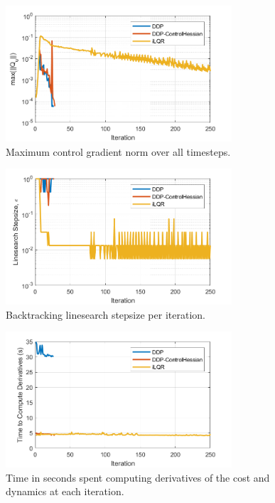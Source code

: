 \begin{figure}[h!]
	\centering
	\includegraphics[width=0.75\textwidth]{Images/Convergence/grad_norm}
	\caption{Maximum control gradient norm over all timesteps.}
	\label{Fig:ConvergeGradient}
\end{figure}
\begin{figure}[h!]
	\centering
	\includegraphics[width=0.75\textwidth]{Images/Convergence/alpha}
	\caption{Backtracking linesearch stepsize per iteration.}
	\label{Fig:ConvergeStepsize}
\end{figure}
\begin{figure}[h!]
	\centering
	\includegraphics[width=0.75\textwidth]{Images/Convergence/time_derivs}
	\caption{Time in seconds spent computing derivatives of the cost and dynamics at each iteration.}
	\label{Fig:ConvergeTime}
\end{figure}


